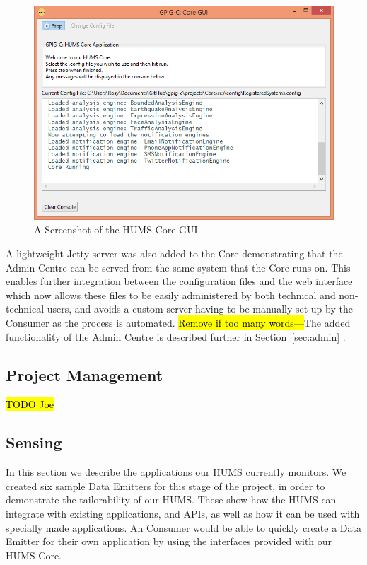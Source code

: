 \documentclass[10pt,a4paper]{article}
\begin{document}
\begin{figure}[ht]
\centering
\includegraphics[width = \textwidth]{images/coreGUI.png}
\caption{A Screenshot of the HUMS Core GUI}
\label{fig:coreGUI}
\end{figure}
A lightweight Jetty server was also added to the Core demonstrating that the Admin Centre can be served from the same system that the Core runs on. This enables further integration between the configuration files and the web interface which now allows these files to be easily administered by both technical and non-technical users, and avoids a custom server having to be manually set up by the Consumer as the process is automated. \hl{Remove if too many words---}The added functionality of the Admin Centre is described further in Section~\ref{sec:admin} \hl{  }. 

\subsection{Project Management}
\hl{TODO Joe}

\subsection{Sensing}
\label{sec:monitor}
In this section we describe the applications our HUMS currently monitors. We created six sample Data Emitters for this stage of the project, in order to demonstrate the tailorability of our HUMS. These show how the HUMS can integrate with existing applications, and APIs, as well as how it can be used with specially made applications. An Consumer would be able to quickly create a Data Emitter for their own application by using the interfaces provided with our HUMS Core.
\end{document}

